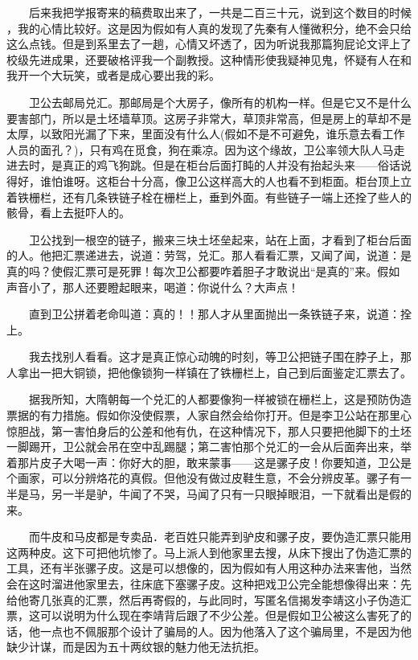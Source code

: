  　　后来我把学报寄来的稿费取出来了，一共是二百三十元，说到这个数目的时候 ，我的心情比较好。这是因为假如有人真的发现了先秦有人懂微积分，绝不会只给 这么点钱。但是到系里去了一趟，心情又坏透了，因为听说我那篇狗屁论文评上了 校级先进成果，还要破格评我一个副教授。这种情形使我疑神见鬼，怀疑有人在和 我开一个大玩笑，或者是成心要出我的彩。 

　　卫公去邮局兑汇。那邮局是个大房子，像所有的机构一样。但是它又不是什么 要害部门，所以是土坯墙草顶。这房子非常大，草顶非常高，但是房上的草却不是 太厚，以致阳光漏了下来，里面没有什么人(假如不是不可避免，谁乐意去看工作 人员的面孔？)，只有鸡在觅食，狗在乘凉。因为这个缘故，卫公率领大队人马走 进去时，是真正的鸡飞狗跳。但是在柜台后面打盹的人并没有抬起头来——俗话说 得好，谁怕谁呀。这柜台十分高，像卫公这样高大的人也看不到柜面。柜台顶上立 着铁栅栏，还有几条铁链子栓在栅栏上，垂到外面。有些链子一端上还拴了些人的 骸骨，看上去挺吓人的。

 　　卫公找到一根空的链子，搬来三块土坯垒起来，站在上面，才看到了柜台后面 的人。他把汇票递进去，说道：劳驾，兑汇。那人看看汇票，又闻了闻，说道：是 真的吗？使假汇票可是死罪！每次卫公都要咋着胆子才敢说出“是真的”来。假如 声音小了，那人还要瞪起眼来，喝道：你说什么？大声点！

 　　直到卫公拼着老命叫道：真的！！那人才从里面抛出一条铁链子来，说道：拴 上。

 　　我去找别人看看。这才是真正惊心动魄的时刻，等卫公把链子围在脖子上，那 人拿出一把大铜锁，把他像锁狗一样镇在了铁栅栏上，自己到后面鉴定汇票去了。 
 
 　　据我所知，大隋朝每一个兑汇的人都要像狗一样被锁在栅栏上，这是预防伪造 票据的有力措施。假如你没使假票，人家自然会给你打开。但是李卫公站在那里心 惊胆战，第一害怕身后的公差和他有仇，在这种情况下，那人只要把他脚下的土坯 一脚踢开，卫公就会吊在空中乱踢腿；第二害怕那个兑汇的一会从后面奔出来，举 着那片皮子大喝一声：你好大的胆，敢来蒙事——这是骡子皮！你要知道，卫公是 个画家，可以分辨烙花的真假。但他没有做过皮鞋生意，不会分辨皮革。骡子有一 半是马，另一半是驴，牛闻了不哭，马闻了只有一只眼掉眼泪，一下就看出是假的 来。

 　　而牛皮和马皮都是专卖品．老百姓只能弄到驴皮和骡子皮，要伪造汇票只能用 这两种皮。这下可把他坑惨了。马上派人到他家里去搜，从床下搜出了伪造汇票的 工具，还有半张骡子皮。这是可以想像的，因为假如有人用这种办法来害他，当然 会在这时溜进他家里去，往床底下塞骡子皮。这种把戏卫公完全能想像得出来：先 给他寄几张真的汇票，然后再寄假的，与此同时，写匿名信揭发李靖这小子伪造汇 票，这可以说明为什么现在李靖背后跟了不少公差。但是假如卫公被这么害死了的 话，他一点也不佩服那个设计了骗局的人。因为他落入了这个骗局里，不是因为他 缺少计谋，而是因为五十两纹银的魅力他无法抗拒。

